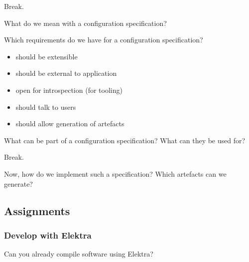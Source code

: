 \begin{assignment}
	\begin{task}
	Break.
	\end{task}
\end{assignment}

\begin{assignment}
	\begin{task}
	What do we mean with a configuration specification?
	\end{task}

	\begin{task}
	Which requirements do we have for a configuration specification?
	\end{task}

	\pause

	\begin{itemize}
	\item should be extensible
	\item should be external to application
	\item open for introspection (for tooling)
	\item should talk to users
	\item should allow generation of artefacts
	\end{itemize}
\end{assignment}

\begin{assignment}
	\begin{task}
	What can be part of a configuration specification?
	What can they be used for?
	\end{task}
\end{assignment}

\begin{assignment}
	\begin{task}
	Break.
	\end{task}
\end{assignment}

\begin{assignment}
	\begin{task}
	Now, how do we implement such a specification?
	Which artefacts can we generate?
	\end{task}
\end{assignment}

\subsection{Assignments}

\begin{frame}
	\frametitle{Develop with Elektra}

	\begin{task}
	Can you already compile software using Elektra?
	\end{task}
\end{frame}

